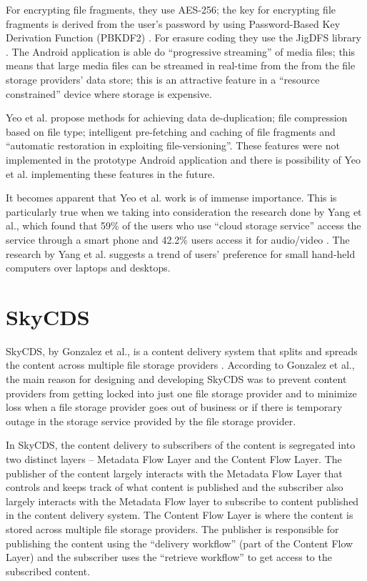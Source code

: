 For encrypting file fragments, they use AES-256; the key for
encrypting file fragments is derived from the user's password by using
Password-Based Key Derivation Function (PBKDF2) \cite{kaliski}. For
erasure coding they use the JigDFS library \cite{jigdfs}. The Android
application is able do ``progressive streaming'' of media files; this
means that large media files can be streamed in real-time from the
from the file storage providers' data store; this is an attractive
feature in a ``resource constrained'' device where storage is
expensive.

Yeo et al. propose methods for achieving data de-duplication; file
compression based on file type; intelligent pre-fetching and caching
of file fragments and ``automatic restoration in exploiting
file-versioning''. These features were not implemented in the
prototype Android application and there is possibility of Yeo et
al. implementing these features in the future.

It becomes apparent that Yeo et al. work is of immense
importance. This is particularly true when we taking into
consideration the research done by Yang et al., which found that 59\%
of the users who use ``cloud storage service'' access the service
through a smart phone and 42.2\% users access it for audio/video
\cite{yang}. The research by Yang et al. suggests a trend of users'
preference for small hand-held computers over laptops and desktops.

\section{SkyCDS}\label{2-skycds-sec}

SkyCDS, by Gonzalez et al., is a content delivery system that splits
and spreads the content across multiple file storage providers
\cite{skycds}. According to Gonzalez et al., the main reason for
designing and developing SkyCDS was to prevent content providers from
getting locked into just one file storage provider and to minimize
loss when a file storage provider goes out of business or if there is
temporary outage in the storage service provided by the file storage
provider.

In SkyCDS, the content delivery to subscribers of the content is
segregated into two distinct layers -- Metadata Flow Layer and the
Content Flow Layer. The publisher of the content largely interacts
with the Metadata Flow Layer that controls and keeps track of what
content is published and the subscriber also largely interacts with
the Metadata Flow layer to subscribe to content published in the
content delivery system. The Content Flow Layer is where the content
is stored across multiple file storage providers. The publisher is
responsible for publishing the content using the ``delivery workflow''
(part of the Content Flow Layer) and the subscriber uses the
``retrieve workflow'' to get access to the subscribed content.

